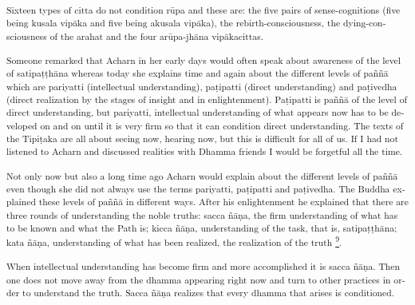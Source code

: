 \textsuperscript{\textdutch{Sixteen types of citta do not condition rūpa
and these are: the five pairs of sense-cognitions (five being kusala
vipāka and five being akusala vipāka), the rebirth-consciousness, the
dying-consciousness of the arahat and the four arūpa-jhāna vipākacittas.
}}

\textsuperscript{\textdutch{Someone remarked that Acharn in her early
days would often speak about awareness of the level of satipaṭṭhāna
whereas today she explains time and again about the different levels of
paññā which are pariyatti (intellectual understanding), paṭipatti
(direct understanding) and paṭivedha (direct realization by the stages
of insight and in enlightenment). Paṭipatti is paññā of the level of
direct understanding, but pariyatti, intellectual understanding of what
appears now has to be developed on and on until it is very firm so that
it can condition direct understanding. The texts of the Tipiṭaka are all
about seeing now, hearing now, but this is difficult for all of us. If I
had not listened to Acharn and discussed realities with Dhamma friends I
would be forgetful all the time. }}

\textsuperscript{\textdutch{Not only now but also a long time ago Acharn
would explain about the different levels of paññā even though she did
not always use the terms }pariyatti,
pa\textitalian{ṭ}\textenglish[variant=american]{ipatti and
pa}\textitalian{ṭ}\textenglish[variant=american]{ivedha}\textdutch{. The
Buddha explained these levels of paññā in different ways. After his
enlightenment he explained that there are three rounds of understanding
the noble truths: }\textitalian{sacca
}ña{{̄}}n{{̣}}\textenglish[variant=american]{a, the firm understanding of
what has to be known and what the Path is; kicca
}ña{{̄}}n{{̣}}\textenglish[variant=american]{a, understanding of the task,
that is, satipat}{{̣}}t{{̣}}ha{{̄}}na; kata
ña{{̄}}n{{̣}}\textenglish[variant=american]{a, understanding of what has
been realized, the realization of the truth}\textdutch{
\protect\hyperlink{sdfootnote9sym}{\textsuperscript{9}}}.}

\textsuperscript{\textdutch{When intellectual understanding has
be}\textenglish[variant=american]{come firm and more accomplished it
}\textitalian{is sacca }ña{{̄}}n{{̣}}\textenglish[variant=american]{a.
Then one does not move away from the dhamma appearing right now and turn
to other practices in order to understand the truth. Sacca
}ña{{̄}}n{{̣}}\textenglish[variant=american]{a realizes that every dhamma
that arises is conditioned. }}

